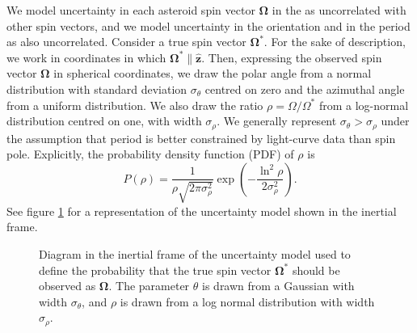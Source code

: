\documentclass[fleqn,usenatbib]{mnras}
\newcommand{\unit}[1]{\bm{\hat{#1}}}
\newcommand{\parens}[1]{\left( #1 \right)}
\begin{document}
We model uncertainty in each asteroid spin vector $\bm \Omega$ in the as uncorrelated with other spin vectors, and we model uncertainty in the orientation and in the period as also uncorrelated. Consider a true spin vector $\bm \Omega^*$. For the sake of description, we work in coordinates in which $\bm \Omega^* \parallel \unit z$. Then, expressing the observed spin vector $\bm \Omega$ in spherical coordinates, we draw the polar angle from a normal distribution with standard deviation $\sigma_\theta$ centred on zero and the azimuthal angle from a uniform distribution. We also draw the ratio $\rho=\Omega/\Omega^*$ from a log-normal distribution centred on one, with width $\sigma_\rho$. We generally represent $\sigma_\theta > \sigma_\rho$ under the assumption that period is better constrained by light-curve data than spin pole. Explicitly, the probability density function (PDF) of $\rho$ is 
\begin{equation}
  P(\rho) = \frac{1}{\rho\sqrt{2\pi \sigma_\rho^2}} \exp\parens{-\frac{\ln^2\rho}{2\sigma_\rho^2}}.
\end{equation}
See figure \ref{fig:uncertainty-model} for a representation of the uncertainty model shown in the inertial frame.

\begin{figure}
  \centering
  \caption{Diagram in the inertial frame of the uncertainty model used to define the probability that the true spin vector $\bm \Omega^*$ should be observed as $\bm \Omega$. The parameter $\theta$ is drawn from a Gaussian with width $\sigma_\theta$, and $\rho$ is drawn from a log normal distribution with width $\sigma_\rho$.}
  \label{fig:uncertainty-model}
\end{figure}
\end{document}

